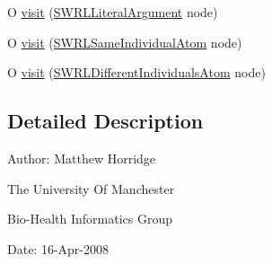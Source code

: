 \begin{DoxyCompactItemize}
\item 
O \hyperlink{interfaceorg_1_1semanticweb_1_1owlapi_1_1model_1_1_s_w_r_l_object_visitor_ex_3_01_o_01_4_ac0a0dab5f3ea813333f6b783afa1fded}{visit} (\hyperlink{interfaceorg_1_1semanticweb_1_1owlapi_1_1model_1_1_s_w_r_l_literal_argument}{S\-W\-R\-L\-Literal\-Argument} node)
\item 
O \hyperlink{interfaceorg_1_1semanticweb_1_1owlapi_1_1model_1_1_s_w_r_l_object_visitor_ex_3_01_o_01_4_a85d67d8297209cf3259c81ca58fbffce}{visit} (\hyperlink{interfaceorg_1_1semanticweb_1_1owlapi_1_1model_1_1_s_w_r_l_same_individual_atom}{S\-W\-R\-L\-Same\-Individual\-Atom} node)
\item 
O \hyperlink{interfaceorg_1_1semanticweb_1_1owlapi_1_1model_1_1_s_w_r_l_object_visitor_ex_3_01_o_01_4_a592da960c81206a0ecb6e1120cc83fb2}{visit} (\hyperlink{interfaceorg_1_1semanticweb_1_1owlapi_1_1model_1_1_s_w_r_l_different_individuals_atom}{S\-W\-R\-L\-Different\-Individuals\-Atom} node)
\end{DoxyCompactItemize}


\subsection{Detailed Description}
Author\-: Matthew Horridge\par
 The University Of Manchester\par
 Bio-\/\-Health Informatics Group\par
 Date\-: 16-\/\-Apr-\/2008\par
\par
 

